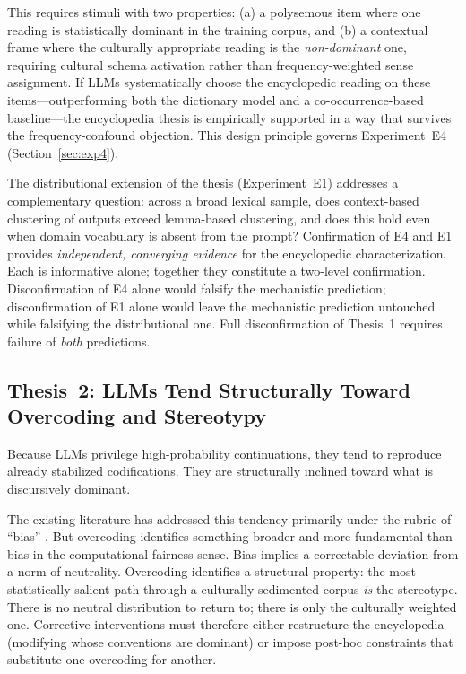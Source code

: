 \documentclass[12pt,a4paper]{article}
\begin{document}
This requires stimuli with two properties: (a) a polysemous item where one
reading is statistically dominant in the training corpus, and (b) a contextual
frame where the culturally appropriate reading is the \emph{non-dominant} one,
requiring cultural schema activation rather than frequency-weighted sense
assignment. If LLMs systematically choose the encyclopedic reading on these
items---outperforming both the dictionary model and a co-occurrence-based
baseline---the encyclopedia thesis is empirically supported in a way that
survives the frequency-confound objection. This design principle governs
Experiment~E4 (Section~\ref{sec:exp4}).

The distributional extension of the thesis (Experiment~E1) addresses a
complementary question: across a broad lexical sample, does context-based
clustering of outputs exceed lemma-based clustering, and does this hold even
when domain vocabulary is absent from the prompt? Confirmation of E4 and E1
provides \emph{independent, converging evidence} for the encyclopedic
characterization. Each is informative alone; together they constitute a
two-level confirmation. Disconfirmation of E4 alone would falsify the
mechanistic prediction; disconfirmation of E1 alone would leave the
mechanistic prediction untouched while falsifying the distributional one.
Full disconfirmation of Thesis~1 requires failure of \emph{both} predictions.

\subsection{Thesis~2: LLMs Tend Structurally Toward Overcoding and Stereotypy}
\label{sec:thesis2}

Because LLMs privilege high-probability continuations, they tend to reproduce
already stabilized codifications. They are structurally inclined toward what
is discursively dominant.

The existing literature has addressed this tendency primarily under the rubric
of ``bias'' \citep{Bender2021}. But overcoding identifies something broader and
more fundamental than bias in the computational fairness sense. Bias implies a
correctable deviation from a norm of neutrality. Overcoding identifies a
structural property: the most statistically salient path through a culturally
sedimented corpus \emph{is} the stereotype. There is no neutral distribution to
return to; there is only the culturally weighted one. Corrective interventions
must therefore either restructure the encyclopedia (modifying whose conventions
are dominant) or impose post-hoc constraints that substitute one overcoding
for another.
\end{document}
